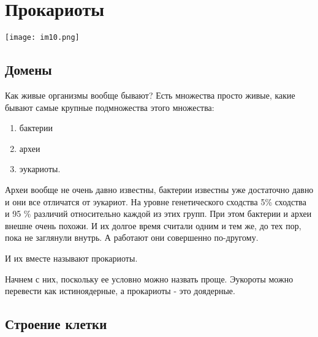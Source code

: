 \section{Прокариоты} 
\texttt{[image: im10.png]}
\subsection{Домены}
Как живые организмы вообще бывают? 
Есть множества просто живые, какие бывают самые крупные подмножества 
этого множества:
\begin{enumerate} 
\item бактерии
\item археи 
\item эукариоты.
\end{enumerate} 

Археи вообще не очень давно известны, бактерии известны уже 
достаточно давно и они все отличатся от эукариот. На уровне 
генетического сходства 5\% сходства и 95 \% различий относительно каждой из этих 
групп. При этом бактерии и археи внешне очень похожи. И их 
долгое время считали одним и тем же, до тех пор, 
пока не заглянули внутрь. А работают они совершенно по-другому. 

И их вместе называют прокариоты. 

Начнем с них, поскольку ее условно можно назвать проще. Эукороты 
можно перевести как истиноядерные, а прокариоты - это доядерные.
 

\subsection{Строение клетки}


